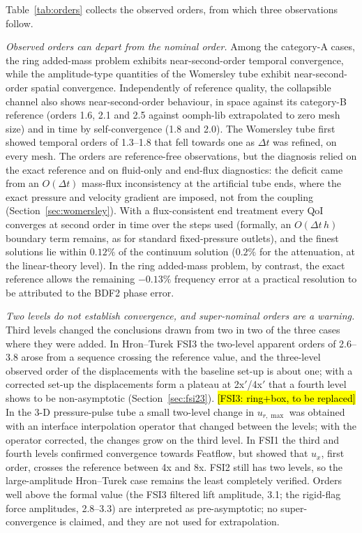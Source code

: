 Table~\ref{tab:orders} collects the observed orders, from which three observations follow.

\emph{Observed orders can depart from the nominal order.}
Among the category-A cases, the ring added-mass problem exhibits near-second-order temporal convergence, while the amplitude-type quantities of the Womersley tube exhibit near-second-order spatial convergence.
Independently of reference quality, the collapsible channel also shows near-second-order behaviour, in space against its category-B reference (orders 1.6, 2.1 and 2.5 against oomph-lib extrapolated to zero mesh size) and in time by self-convergence (1.8 and 2.0).
The Womersley tube first showed temporal orders of 1.3--1.8 that fell towards one as $\Delta t$ was refined, on every mesh.
The orders are reference-free observations, but the diagnosis relied on the exact reference and on fluid-only and end-flux diagnostics: the deficit came from an $O(\Delta t)$ mass-flux inconsistency at the artificial tube ends, where the exact pressure and velocity gradient are imposed, not from the coupling (Section~\ref{sec:womersley}).
With a flux-consistent end treatment every QoI converges at second order in time over the steps used (formally, an $O(\Delta t\,h)$ boundary term remains, as for standard fixed-pressure outlets), and the finest solutions lie within $0.12\%$ of the continuum solution ($0.2\%$ for the attenuation, at the linear-theory level).
In the ring added-mass problem, by contrast, the exact reference allows the remaining $-0.13\%$ frequency error at a practical resolution to be attributed to the BDF2 phase error.

\emph{Two levels do not establish convergence, and super-nominal orders are a warning.}
Third levels changed the conclusions drawn from two in two of the three cases where they were added.
In Hron--Turek FSI3 the two-level apparent orders of 2.6--3.8 arose from a sequence crossing the reference value, and the three-level observed order of the displacements with the baseline set-up is about one; with a corrected set-up the displacements form a plateau at 2x$'$/4x$'$ that a fourth level shows to be non-asymptotic (Section~\ref{sec:fsi23}). \hl{[FSI3: ring+box, to be replaced]}
In the 3-D pressure-pulse tube a small two-level change in $u_{r,\max}$ was obtained with an interface interpolation operator that changed between the levels; with the operator corrected, the changes grow on the third level.
In FSI1 the third and fourth levels confirmed convergence towards Featflow, but showed that $u_x$, first order, crosses the reference between 4x and 8x. FSI2 still has two levels, so the large-amplitude Hron--Turek case remains the least completely verified.
Orders well above the formal value (the FSI3 filtered lift amplitude, 3.1; the rigid-flag force amplitudes, 2.8--3.3) are interpreted as pre-asymptotic; no super-convergence is claimed, and they are not used for extrapolation.


